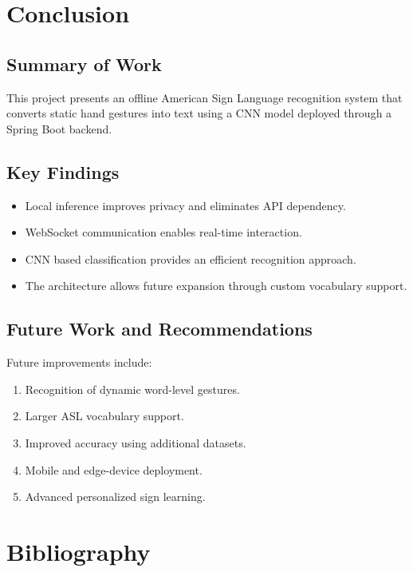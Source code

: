 \documentclass[11pt,a4paper]{report}
\begin{document}
\chapter{Conclusion}

\section{Summary of Work}

This project presents an offline American Sign Language recognition system that converts static hand gestures into text using a CNN model deployed through a Spring Boot backend.

\section{Key Findings}

\begin{itemize}
\item Local inference improves privacy and eliminates API dependency.
\item WebSocket communication enables real-time interaction.
\item CNN based classification provides an efficient recognition approach.
\item The architecture allows future expansion through custom vocabulary support.
\end{itemize}

\section{Future Work and Recommendations}

Future improvements include:

\begin{enumerate}
\item Recognition of dynamic word-level gestures.
\item Larger ASL vocabulary support.
\item Improved accuracy using additional datasets.
\item Mobile and edge-device deployment.
\item Advanced personalized sign learning.
\end{enumerate}


\chapter*{Bibliography}
\end{document}
